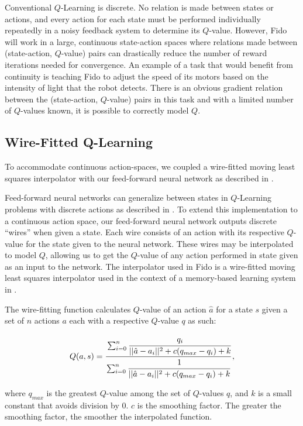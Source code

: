 Conventional $Q$-Learning is discrete. No relation is made between states or actions, and every action for each state must be performed individually repeatedly in a noisy feedback system to determine its $Q$-value. However, Fido will work in a large, continuous state-action spaces where relations made between (state-action, $Q$-value) pairs can drastically reduce the number of reward iterations needed for convergence. An example of a task that would benefit from continuity is teaching Fido to adjust the speed of its motors based on the intensity of light that the robot detects. There is an obvious gradient relation between the (state-action, $Q$-value) pairs in this task and with a limited number of $Q$-values known, it is possible to correctly model $Q$.

\subsection{Wire-Fitted Q-Learning}

To accommodate continuous action-spaces, we coupled a wire-fitted moving least squares interpolator with our feed-forward neural network as described in \cite{gaskett}. 

Feed-forward neural networks can generalize between states in $Q$-Learning problems with discrete actions as described in \cite{rummery}. To extend this implementation to a continuous action space, our feed-forward neural network outputs discrete ``wires'' when given a state. Each wire consists of an action with its respective $Q$-value for the state given to the neural network. These wires may be interpolated to model $Q$, allowing us to get the $Q$-value of any action performed in state given as an input to the network. The interpolator used in Fido is a wire-fitted moving least squares interpolator used in the context of a memory-based learning system in \cite{baird}.

The wire-fitting function calculates $Q$-value of an action $\hat{a}$ for a state $s$ given a set of $n$ actions $a$ each with a respective $Q$-value $q$ as such:

\begin{equation}
	Q(a, s) = \cfrac{\sum_{i=0}^{n}\cfrac{q_i}{||\hat{a}-a_i||^2+c(q_{max}-q_i)+k}}{\sum_{i=0}^{n}\cfrac{1}{||\hat{a}-a_i||^2+c(q_{max}-q_i)+k}}
	\,,
\end{equation}

\noindent
where $q_{max}$ is the greatest $Q$-value among the set of $Q$-values $q$, and $k$ is a small constant that avoids division by 0. $c$ is the smoothing factor. The greater the smoothing factor, the smoother the interpolated function.


